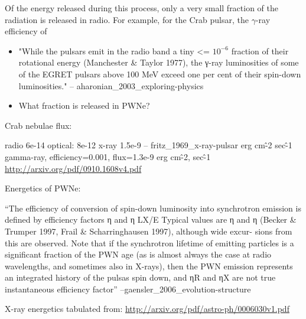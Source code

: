 Of the energy released during this process, only a very small fraction of the 
radiation is released in radio. For example, 
for the Crab pulsar, the $\gamma$-ray efficiency of 


\begin{itemize}
\item "While the pulsars emit in the radio band a tiny <= $10^{-6}$
fraction of their rotational energy (Manchester \& Taylor 1977), the
γ-ray luminosities of some of the EGRET pulsars above 100 MeV exceed
one per cent of their spin-down luminosities." -- aharonian\_2003\_exploring-physics
  \item What fraction is released in PWNe?
\end{itemize}

Crab nebulae flux:

radio 6e-14
optical: 8e-12
x-ray 1.5e-9 -- fritz\_1969\_x-ray-pulsar erg cm\^-2 sec\^-1
gamma-ray, efficiency=0.001, flux=1.3e-9 erg cm\^-2, sec\^-1  \url{http://arxiv.org/pdf/0910.1608v4.pdf}



Energetics of PWNe:

``The efficiency of conversion of spin-down luminosity into synchrotron
emission is defined by efficiency factors η and
η LX/E  Typical values are η
and η (Becker \& Trumper 1997, Frail
\& Scharringhausen 1997), although wide excur- sions from this are
observed. Note that if the synchrotron lifetime of emitting particles is
a significant fraction of the PWN age (as is almost always the case at
radio wavelengths, and sometimes also in X-rays), then the PWN emission
represents an integrated history of the pulsas spin down,
and ηR and ηX are not true instantaneous efficiency factor'' --gaensler\_2006\_evolution-structure

X-ray energetics tabulated from: \url{http://arxiv.org/pdf/astro-ph/0006030v1.pdf}
